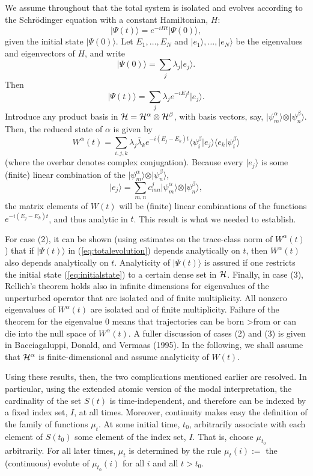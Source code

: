 \documentclass[12pt]{article}
\newcommand{\be}{\begin{equation}}
\newcommand{\ee}{\end{equation}}
\newcommand{\cH}{\cal{H}}                                       %
\newcommand{\ga}{\alpha}                                        %
\newcommand{\gb}{\beta}                                         %
\newcommand{\ket}[1]{\vert #1\rangle}                           %
\newcommand{\braket}[2]{\langle #1\vert #2\rangle}              %
\begin{document}
We assume throughout that the total system is isolated and evolves
according to the Schr\"odinger equation with a constant Hamiltonian,
$H$:
\be
\label{eq:totalevolution}
\ket{\Psi(t)}=e^{-iHt}\ket{\Psi(0)},
\ee
given the initial state $\ket{\Psi(0)}$.  Let $E_1,\ldots,E_N$ and
$\ket{e_1},\ldots,\ket{e_N}$ be the eigenvalues and eigenvectors of
$H$, and write
\be
\label{eq:initialstate}
\ket{\Psi(0)}=\sum_j\lambda_j\ket{e_j}.
\ee
\noindent Then
\be
\ket{\Psi(t)}=\sum_j\lambda_j e^{-iE_jt}\ket{e_j}.
\ee
Introduce any product basis in $\cH = \cH^\ga \otimes \cH^\gb$, with
basis vectors, say, $\ket{\psi^\ga_m}\otimes\ket{\psi^\gb_n}$.  Then,
the reduced state of $\ga$ is given by
\be
W^\ga(t) = \sum_{i,j,k}\lambda_j\overline{\lambda}_k e^{-i(E_j-E_k)t}
\braket{\psi^\gb_i}{e_j}\braket{e_k}{\psi^\gb_i}
\ee
(where the overbar denotes complex conjugation).
Because every $\ket{e_j}$ is some (finite) linear combination
of the $\ket{\psi^\ga_m} \otimes \ket{\psi^\gb_n}$,
\be
\ket{e_j} = \sum_{m,n} c^j_{mn} \ket{\psi^\ga_m} \otimes \ket{\psi^\gb_n},
\ee
\noindent the matrix elements of $W(t)$ will be (finite) linear
combinations of the functions $e^{-i(E_j-E_k)t}$, and thus analytic in
$t$.  This result is what we needed to establish.

For case (2), it can be shown (using estimates on the trace-class norm
of $W^\ga(t)$) that if $\ket{\Psi(t)}$ in (\ref{eq:totalevolution})
depends analytically on $t$, then $W^\ga(t)$ also depends analytically
on $t$.  Analyticity of $\ket{\Psi(t)}$ is assured if one restricts the
initial state (\ref{eq:initialstate}) to a certain dense set in $\cH$.
Finally, in case (3), Rellich's theorem holds also in infinite
dimensions for eigenvalues of the unperturbed operator that are
isolated and of finite multiplicity.  All nonzero eigenvalues of
$W^\ga(t)$ are isolated and of finite multiplicity.  Failure of the
theorem for the eigenvalue $0$ means that trajectories can be born
>from or can die into the null space of $W^\ga(t)$.  A fuller
discussion of cases (2) and (3) is given in Bacciagaluppi, Donald,
and Vermaas (1995).  In the following, we shall assume that $\cH^\ga$ is
finite-dimensional and assume analyticity of $W(t)$.

Using these results, then, the two complications
mentioned earlier are resolved.  In particular, using the extended atomic
version of the modal interpretation, the cardinality of the set $S(t)$
is time-independent, and therefore can be indexed by a fixed index
set, $I$, at all times.  Moreover, continuity makes easy the
definition of the family of functions $\mu_{t}$.  At some initial
time, $t_{0}$, arbitrarily associate with each element of $S(t_{0})$
some element of the index set, $I$.  That is, choose $\mu_{t_{0}}$
arbitrarily.  For all later times, $\mu_{t}$ is determined by the
rule $\mu_t(i) := $ the (continuous) evolute of $\mu_{t_0}(i)$ for
all $i$ and all $t>t_0$.
\end{document}
